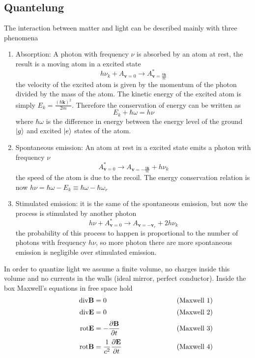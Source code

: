 \documentclass[12pt]{article}
\theoremstyle{plain}
\renewcommand{\k}{\mathbf{k}}
\theoremstyle{definition}
\theoremstyle{remark}
\begin{document}
\subsection{Quantelung}
The interaction between matter and light can be described mainly with three phenomena 
\begin{enumerate}[(1)]
\item Absorption: A photon with frequency $\nu$ is absorbed by an atom at rest, the result is a moving atom in a excited state
\begin{equation}h\nu_{k} + A_{\mathbf{v}=0} \longrightarrow A^*_{\mathbf{v}=\frac{\hbar \k}{m}}\end{equation}
the velocity of the excited atom is given by the momentum of the photon divided by the mass of the atom. The kinetic energy of the excited atom is simply $E_k = \frac{(\hbar \k)^2}{2m}$. Therefore the conservation of energy can be written as
\begin{equation}E_k +\hbar \omega = h\nu\end{equation}
where $\hbar \omega$ is the difference in energy between the energy level of the ground $\ket{g}$ and excited $\ket{e}$ states of the atom.
\item Spontaneous emission: An atom at rest in a excited state emits a photon with frequency $\nu$
\begin{equation}A^*_{\mathbf{v}=0} \longrightarrow A_{\mathbf{v}=-\frac{\hbar \k}{m}} + h \nu_k\end{equation}
the speed of the atom is due to the recoil. The energy conservation relation is now $h\nu=\hbar\omega-E_k \equiv \hbar \omega -\hbar \omega_r $
\item Stimulated emission: it is the same of the spontaneous emission, but now the process is stimulated by another photon
\begin{equation}h\nu + A^*_{\mathbf{v}=0} \longrightarrow A_{\mathbf{v}=-\mathbf{v}_r} + 2 h \nu_k\end{equation}
the probability of this process to happen is proportional to the number of photons  with frequency $h\nu$, so more photon there are more spontaneous emission is negligible over stimulated emission.
\end{enumerate}
In order to quantize light we assume a finite volume, no charges inside this volume and no currents in the walls (ideal mirror, perfect conductor). Inside the box Maxwell's equations in free space hold
\[
    \begin{alignedat}{3}
        & & \text{div}\mathbf{B} &=0 & \hskip8em &\text{\rlap{(Maxwell 1)}} \\[0.5ex]
        & & \text{div}\mathbf{E} &=0 & &\text{\rlap{(Maxwell 2)}} \\[0.5ex]
        & &\text{rot}\mathbf{E} &=-\frac{\partial \mathbf{B}}{\partial t} & &\text{\rlap{(Maxwell 3)}} \\[0.5ex]
        & & \text{rot}\mathbf{B} &=\frac{1}{c^2}\frac{\partial \mathbf{E}}{\partial t} & &\text{\rlap{(Maxwell 4)}}
    \end{alignedat}
\]
\end{document}
